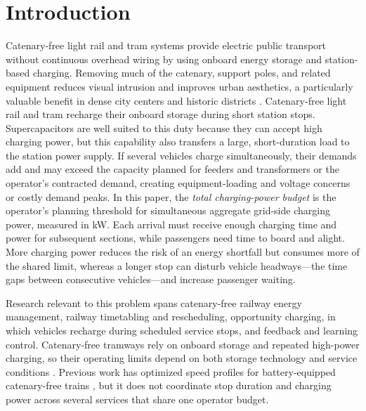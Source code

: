 \documentclass[conference]{IEEEtran}
\begin{document}
\section{Introduction}
Catenary-free light rail and tram systems provide electric public transport without continuous overhead wiring by using onboard energy storage and station-based charging. Removing much of the catenary, support poles, and related equipment reduces visual intrusion and improves urban aesthetics, a particularly valuable benefit in dense city centers and historic districts \cite{guerrieri2019catenary}. Catenary-free light rail and tram recharge their onboard storage during short station stops. Supercapacitors are well suited to this duty because they can accept high charging power, but this capability also transfers a large, short-duration load to the station power supply. If several vehicles charge simultaneously, their demands add and may exceed the capacity planned for feeders and transformers or the operator's contracted demand, creating equipment-loading and voltage concerns or costly demand peaks. In this paper, the \emph{total charging-power budget} is the operator's planning threshold for simultaneous aggregate grid-side charging power, measured in kW. Each arrival must receive enough charging time and power for subsequent sections, while passengers need time to board and alight. More charging power reduces the risk of an energy shortfall but consumes more of the shared limit, whereas a longer stop can disturb vehicle headways---the time gaps between consecutive vehicles---and increase passenger waiting.

Research relevant to this problem spans catenary-free railway energy management, railway timetabling and rescheduling, opportunity charging, in which vehicles recharge during scheduled service stops, and feedback and learning control. Catenary-free tramways rely on onboard storage and repeated high-power charging, so their operating limits depend on both storage technology and service conditions \cite{guerrieri2019catenary}. Previous work has optimized speed profiles for battery-equipped catenary-free trains \cite{ghaviha2019speed}, but it does not coordinate stop duration and charging power across several services that share one operator budget.

\nocite{wang2019multitrain,liu2020robust,yang2020biobjective,huang2021integrated,huang2023twostage,liao2020realtime,he2020charging,hu2022joint,li2023cooperative,duan2023integrated,bi2024realtime,wu2022multidepot,li2023trajectory,schulman2017ppo,holland1975adaptation,kennedy1995pso,storn1997de}
\end{document}

